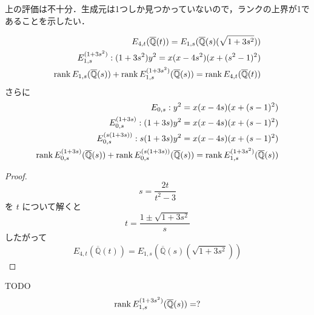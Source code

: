 \documentclass[main]{subfiles}
\begin{document}
上の評価は不十分．生成元は1つしか見つかっていないので，ランクの上界が1であることを示したい．
\begin{thm}
    \begin{align}
        E_{4,t}(\overline{\mathbb{Q}}(t)) = E_{1,s}(\overline{\mathbb{Q}}(s)(\sqrt{1 + 3s^{2}})) \\
        E_{1,s}^{(1 + 3s^{2})}: (1 + 3s^{2}) y^{2} = x(x - 4s^{2})(x + (s^{2} - 1)^{2})          \\
        \operatorname{rank} E_{1,s}(\overline{\mathbb{Q}}(s)) + \operatorname{rank} E_{1,s}^{(1 + 3s^{2})}(\overline{\mathbb{Q}}(s)) = \operatorname{rank} E_{4,t}(\overline{\mathbb{Q}}(t))
    \end{align}
    さらに
    \begin{align}
        E_{0,s}: y^{2} = x(x - 4s)(x + (s - 1)^{2})                         \\
        E_{0,s}^{(1 + 3s)}: (1 + 3s) y^{2} = x(x - 4s)(x + (s - 1)^{2})     \\
        E_{0,s}^{(s(1 + 3s))}: s(1 + 3s) y^{2} = x(x - 4s)(x + (s - 1)^{2}) \\
        \operatorname{rank} E_{0,s}^{(1 + 3s)}(\overline{\mathbb{Q}}(s)) + \operatorname{rank} E_{0,s}^{(s(1 + 3s))}(\overline{\mathbb{Q}}(s)) = \operatorname{rank} E_{1,s}^{(1 + 3s^{2})}(\overline{\mathbb{Q}}(s))
    \end{align}
\end{thm}
\begin{proof}
    \begin{equation}
        s = \frac{2t}{t^{2} - 3}
    \end{equation}
    を $t$ について解くと
    \begin{equation}
        t = \frac{1 \pm \sqrt{1 + 3s^{2}}}{s}
    \end{equation}
    したがって
    \begin{equation}
        E_{4,t}(\overline{\mathbb{Q}}(t)) = E_{1,s}(\overline{\mathbb{Q}}(s)(\sqrt{1 + 3s^{2}}))
    \end{equation}
\end{proof}

\begin{thm}
    TODO
    \begin{equation}
        \operatorname{rank} E_{1,s}^{(1 + 3s^{2})}(\overline{\mathbb{Q}}(s)) = ?
    \end{equation}
\end{thm}
\end{document}
